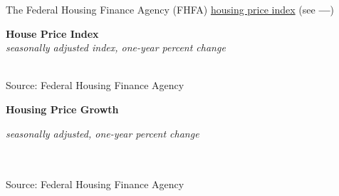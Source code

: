 \documentclass{report}
\makeatletter
\newcommand{\tbllink}[1]{\href{https://raw.githubusercontent.com/bdecon/US-chartbook/master/chartbook/data/#1}{\faTable}}
\newcommand*\short[1]{\expandafter\@gobbletwo\number\numexpr#1\relax}
\newcommand{\dateaxisticks}{
		date coordinates in=x, axis line style={draw=none},
		xmax={2020-05-10},
		max space between ticks=40,	    
		xtick={{1990-01-01}, {1992-01-01}, {1994-01-01}, 
			{1996-01-01}, {1998-01-01}, {2000-01-01}, 
			{2002-01-01}, {2004-01-01}, {2006-01-01},
			{2008-01-01}, {2010-01-01}, {2012-01-01}, {2014-01-01},
		    {2016-01-01}, {2018-01-01}, {2020-01-01}},
		minor xtick={{1989-01-01}, {1991-01-01}, {1993-01-01},
			{1995-01-01}, {1997-01-01}, {1999-01-01}, 
			{2001-01-01}, {2003-01-01}, {2005-01-01}, {2007-01-01},
		    {2009-01-01}, {2011-01-01}, {2013-01-01}, {2015-01-01},
		    {2017-01-01}, {2019-01-01}},
		enlarge y limits={0.06}, enlarge x limits={0.01},
		}
\newcommand{\bbar}[2]{extra #1 ticks = {{#2}}, extra #1 tick labels = ,
		extra #1 tick style = {grid=major, grid style={thick, black!25}},}
\newcommand{\thickline}[4]{\addplot[ultra thick, no markers, color=#1] 
		table [x=#2, y=#3, col sep=comma] {#4};	}
\newcommand{\rebars}{
		\fill[color=black!10] (axis cs:{2007-12-01},\pgfkeysvalueof{/pgfplots/ymin}) rectangle 
			(axis cs:{2009-07-01}, \pgfkeysvalueof{/pgfplots/ymax});
		\fill[color=black!10] (axis cs:{2001-03-01},\pgfkeysvalueof{/pgfplots/ymin}) rectangle 
			(axis cs:{2001-11-01}, \pgfkeysvalueof{/pgfplots/ymax});}
\makeatother
\begin{document}
{{{{\begin{minipage}{0.76\textwidth}

\small The Federal Housing Finance Agency (FHFA) \href{https://www.fhfa.gov/DataTools/Downloads/Pages/House-Price-Index-Datasets.aspx}{housing price index} (see {\color{blue!40!cyan}\textbf{---}}) \\

\vspace{2mm}

\noindent \normalsize \textbf{House Price Index}\\
\footnotesize{\textit{seasonally adjusted index, one-year percent change}}\\
\noindent \hspace*{-2mm} \\
\footnotesize{Source: Federal Housing Finance Agency} \hspace{54mm} \tbllink{hpi.csv}

\end{minipage}

\vspace{4mm}

\noindent \normalsize \textbf{Housing Price Growth}\\
\footnotesize{\textit{seasonally adjusted, one-year percent change}\\
\vspace{-5mm}

\hspace*{-3mm} \noindent {} \setlength{\tabcolsep}{3.1pt} \color{black!90}
		{\renewcommand{\arraystretch}{1.55}
		 \begin{tabular}{p{24mm} R{7.1mm} R{7.1mm} R{7.1mm} R{7.1mm} R{7.1mm} R{7.1mm} R{7.1mm} R{12.0mm} R{10.8mm}}
			 \hline
		\end{tabular}
		}	\\
		
\vspace{-2mm}
\footnotesize{Source: Federal Housing Finance Agency} \hspace{6.3cm} \tbllink{hpi.csv}

}}}}}
\end{document}
